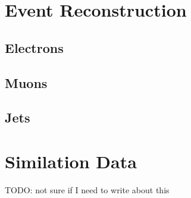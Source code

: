 \section{Event Reconstruction}

\subsection{Electrons}

\subsection{Muons}

\subsection{Jets}

\section{Similation Data}

TODO: not sure if I need to write about this